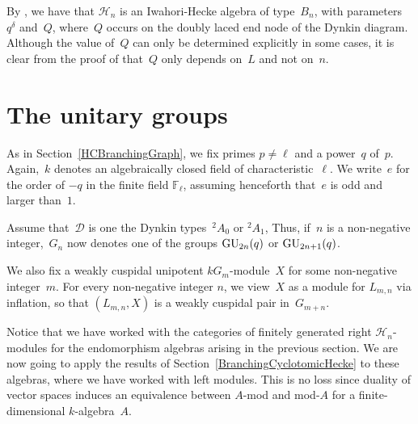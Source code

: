 \documentclass[twoside,12pt]{amsart}
\theoremstyle{plain}
\begin{document}
By \cite[Theorem 3.2]{GerberHissJacon2014}, we have that $\mathscr{H}_n$ is an
Iwahori-Hecke algebra of type~$B_n$, with parameters~$q^\delta$ and~$Q$, 
where~$Q$ occurs on the doubly laced end node of the Dynkin diagram. Although
the value of~$Q$ can only be determined explicitly in some cases, it is clear
from the proof of \cite[Theorem 3.2]{GerberHissJacon2014} that~$Q$ only depends 
on~$L$ and not on~$n$. 

\section{The unitary groups}
\label{unitarygroups}

As in Section~\ref{HCBranchingGraph}, we fix primes $p \neq \ell$ and a 
power~$q$ of~$p$. Again,~$k$ denotes an algebraically closed field of 
characteristic~$\ell$. We write~$e$ for the order of $-q$ in the finite field 
$\mathbb{F}_{\ell}$, assuming henceforth that~$e$ is odd and larger than~$1$.

Assume that~$\mathcal{D}$ is one the Dynkin types~${^2\!}A_0$ or ${^2\!}A_1$,
Thus, if~$n$ is a non-negative integer,~$G_n$ now denotes one of the groups
${\mbox{\rm GU}}_{2n}(q)$ or ${\mbox{\rm GU}}_{2n+1}(q)$. 

We also fix a weakly cuspidal unipotent $kG_m$-module~$X$ for some non-negative
integer~$m$. For every non-negative integer $n$, we view~$X$ as a module for
$L_{m,n}$ via inflation, so that $(L_{m,n},X)$ is a weakly cuspidal pair
in~$G_{m + n}$.

Notice that we have worked with the categories of finitely generated right
$\mathscr{H}_n$-modules for the endomorphism algebras arising in the previous
section. We are now going to apply the results of 
Section~\ref{BranchingCyclotomicHecke} to these algebras, where we have 
worked with left modules. This is no loss since duality of vector spaces
induces an equivalence between $A$-mod and mod-$A$ for a finite-dimensional
$k$-algebra~$A$.
\end{document}
